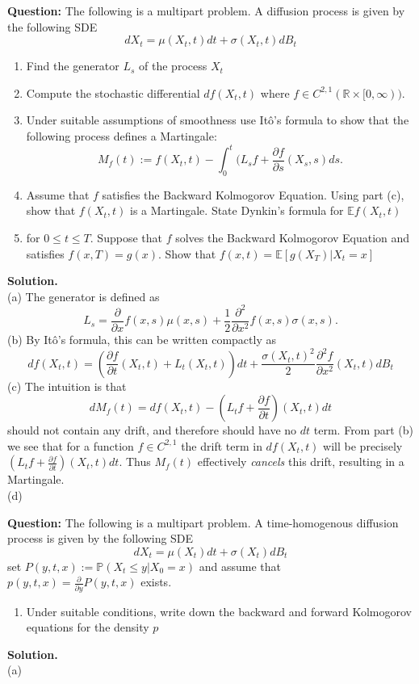 \documentclass{article}
\begin{document}
\begin{tcolorbox}[colframe=black,colback=gray!5,boxrule=0.5pt]
\textbf{Question:} The following is a multipart problem. A diffusion process is given by the following SDE 
$$dX_t = \mu(X_t,t)dt + \sigma(X_t,t)dB_t$$
\begin{enumerate}[label=(\alph*)]
    \item Find the generator $L_s$ of the process $X_t$
    \item Compute the stochastic differential $df(X_t,t)$ where $f\in C^{2,1}(\mathbb{R}\times[0,\infty))$. 
    \item Under suitable assumptions of smoothness use Itô's formula to show that the following process defines a Martingale:
    $$M_f(t):=f(X_t,t)-\int_0^t(L_sf+\frac{\partial f}{\partial s}(X_s,s)ds.$$
    \item Assume that $f$ satisfies the Backward Kolmogorov Equation. Using part (c), show that $f(X_t,t)$ is a Martingale. State Dynkin's formula for $\mathbb{E}f(X_t,t)$
    \item for $0\leq t\leq T$. Suppose that $f$ solves the Backward Kolmogorov Equation and satisfies $f(x,T)=g(x)$. Show that $f(x,t) = \mathbb{E}[g(X_T)|X_t=x]$
\end{enumerate}
\end{tcolorbox}
\textbf{Solution.} \\
(a) The generator is defined as
$$L_s = \frac{\partial}{\partial x}f(x,s)\mu(x,s) + \frac{1}{2}\frac{\partial^2}{\partial x^2}f(x,s)\sigma(x,s).$$
(b) By Itô's formula, this can be written compactly as 
$$df(X_t,t) = \left(\frac{\partial f}{\partial t}(X_t,t) + L_t(X_t,t)\right)dt + \frac{\sigma(X_t,t)^2}{2}\frac{\partial^2 f}{\partial x^2}(X_t,t)dB_t$$
(c) The intuition is that $$dM_f(t) = df(X_t,t) - (L_tf+\frac{\partial f}{\partial t})(X_t,t)dt$$ 
should not contain any drift, and therefore should have no $dt$ term. From part (b) we see that for a function $f\in C^{2,1}$ the drift term in $df(X_t,t)$ will be precisely $(L_tf+\frac{\partial f}{\partial t})(X_t,t)dt$. Thus $M_f(t)$ effectively \textit{cancels} this drift, resulting in a Martingale. \\
(d)


\begin{tcolorbox}[colframe=black,colback=gray!5,boxrule=0.5pt]
\textbf{Question:} The following is a multipart problem. A time-homogenous diffusion process is given by the following SDE 
$$dX_t = \mu(X_t)dt + \sigma(X_t)dB_t$$
set $P(y,t,x) := \mathbb{P}(X_t\leq y|X_0=x)$ and assume that $p(y,t,x)=\frac{\partial}{\partial y}P(y,t,x)$ exists.
\begin{enumerate}[label=(\alph*)]
    \item Under suitable conditions, write down the backward and forward Kolmogorov equations for the density $p$
\end{enumerate}
\end{tcolorbox}
\textbf{Solution.} \\
(a) 
\end{document}
